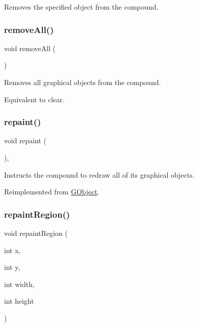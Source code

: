 Removes the specified object from the compound. 

\mbox{\label{classsgl_1_1GCompound_a9b0a5a3ad9972ab0e8eb0b54873aac6b}} 
\subsubsection{\texorpdfstring{remove\+All()}{removeAll()}}
{\footnotesize\ttfamily void remove\+All (\begin{DoxyParamCaption}{ }\end{DoxyParamCaption})\hspace{0.3cm}{\ttfamily [virtual]}}



Removes all graphical objects from the compound. 

Equivalent to clear. \mbox{\label{classsgl_1_1GCompound_afb8dbc55702230f0030e47d6c009697f}} 
\subsubsection{\texorpdfstring{repaint()}{repaint()}}
{\footnotesize\ttfamily void repaint (\begin{DoxyParamCaption}{ }\end{DoxyParamCaption})\hspace{0.3cm}{\ttfamily [override]}, {\ttfamily [virtual]}}



Instructs the compound to redraw all of its graphical objects. 



Reimplemented from \mbox{\hyperlink{classsgl_1_1GObject_ac827b978aa122f136a14c198687ad80f}{G\+Object}}.

\mbox{\label{classsgl_1_1GCompound_a4a919e3851ebfbf0f161a66cc15d4531}} 
\subsubsection{\texorpdfstring{repaint\+Region()}{repaintRegion()}\hspace{0.1cm}{\footnotesize\ttfamily [1/2]}}
{\footnotesize\ttfamily void repaint\+Region (\begin{DoxyParamCaption}\item[{int}]{x,  }\item[{int}]{y,  }\item[{int}]{width,  }\item[{int}]{height }\end{DoxyParamCaption})\hspace{0.3cm}{\ttfamily [virtual]}}



